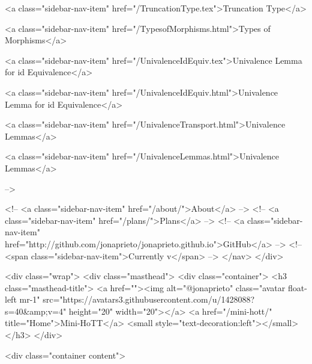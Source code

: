       
    
      
        
          <a class="sidebar-nav-item" href="/TruncationType.tex">Truncation Type</a>
        
      
    
      
        
          <a class="sidebar-nav-item" href="/TypesofMorphisms.html">Types of Morphisms</a>
        
      
    
      
        
          <a class="sidebar-nav-item" href="/UnivalenceIdEquiv.tex">Univalence Lemma for id Equivalence</a>
        
      
    
      
        
          <a class="sidebar-nav-item" href="/UnivalenceIdEquiv.html">Univalence Lemma for id Equivalence</a>
        
      
    
      
        
          <a class="sidebar-nav-item" href="/UnivalenceTransport.html">Univalence Lemmas</a>
        
      
    
      
        
          <a class="sidebar-nav-item" href="/UnivalenceLemmas.html">Univalence Lemmas</a>
        
      
     -->

    <!-- <a class="sidebar-nav-item" href="/about/">About</a> -->
    <!-- <a class="sidebar-nav-item" href="/plans/">Plans</a> -->
    <!-- <a class="sidebar-nav-item" href="http://github.com/jonaprieto/jonaprieto.github.io">GitHub</a> -->
    <!-- <span class="sidebar-nav-item">Currently v</span> -->
  </nav>
</div>

    <div class="wrap">
      <div class="masthead">
        <div class="container">
          <h3 class="masthead-title">
            <a href=""><img alt="@jonaprieto" class="avatar float-left mr-1" src="https://avatars3.githubusercontent.com/u/1428088?s=40&amp;v=4" height="20" width="20"></a>
            <a href="/mini-hott/" title="Home">Mini-HoTT</a>
            <small style="text-decoration:left"></small>
          </h3>
        </div>
      
      <div class="container content">
        







